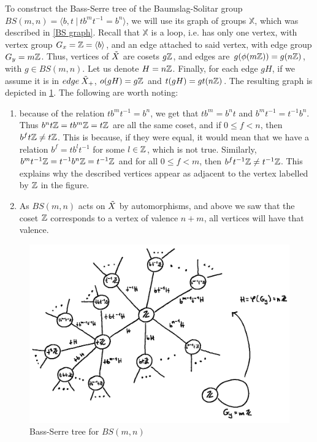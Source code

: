 \begin{importantexample}
    To construct the Bass-Serre tree of the Baumslag-Solitar group $BS(m,n) = \langle b,t \: | \: tb^mt^{-1} = b^n \rangle$, we will use its graph of groups $\mathbb{X}$, which was described in \ref{BS graph}. Recall that $\mathbb{X}$ is a loop, i.e. has only one vertex, with vertex group $G_x = \mathbb{Z} = \langle b\rangle$, and an edge attached to said vertex, with edge group $G_y = m\mathbb{Z}$. Thus, vertices of $\Tilde{X}$ are cosets $g\mathbb{Z}$, and edges are $g(\phi(m\mathbb{Z})) = g(n\mathbb{Z})$, with $g \in BS(m,n)$. Let us denote $H=n\mathbb{Z}$. Finally, for each edge $gH$, if we assume it is in $edge \: \Tilde{X}_+$, $o(gH) = g\mathbb{Z}$ and $t(gH) = gt(n\mathbb{Z})$.
    The resulting graph is depicted in \ref{BS tree}.
    The following are worth noting:
    \begin{enumerate}
        \item because of the relation $tb^mt^{-1} = b^n$, we get that $tb^m = b^nt$ and $b^mt^{-1} = t^{-1}b^n$. Thus $b^nt\mathbb{Z} = tb^m\mathbb{Z} = t\mathbb{Z}$ are all the same coset, and if $0 \le f <n$, then $b^ft\mathbb{Z} \neq t\mathbb{Z}$. This is because, if they were equal, it would mean that we have a relation $b^f = tb^lt^{-1}$ for some $l \in \mathbb{Z}$, which is not true. Similarly, $b^mt^{-1}\mathbb{Z} = t^{-1}b^n\mathbb{Z} = t^{-1}\mathbb{Z}$ and for all $0 \le f <m$, then $b^ft^{-1}\mathbb{Z} \neq t^{-1}\mathbb{Z}$.
        This explains why the described vertices appear as adjacent to the vertex labelled by $\mathbb{Z}$ in the figure.
        \item As $BS(m,n)$ acts on $\Tilde{X}$ by automorphisms, and above we saw that the coset $\mathbb{Z}$ corresponds to a vertex of valence $n+m$, all vertices will have that valence. 
    \end{enumerate}
\end{importantexample}

\begin{figure}[ht]
    \centering
    \includegraphics[scale = 0.38]{sections/alicja/Tree of BS(m,n) corrected.jpeg}
    \caption{Bass-Serre tree for $BS(m,n)$}
    \label{BS tree}
\end{figure}

